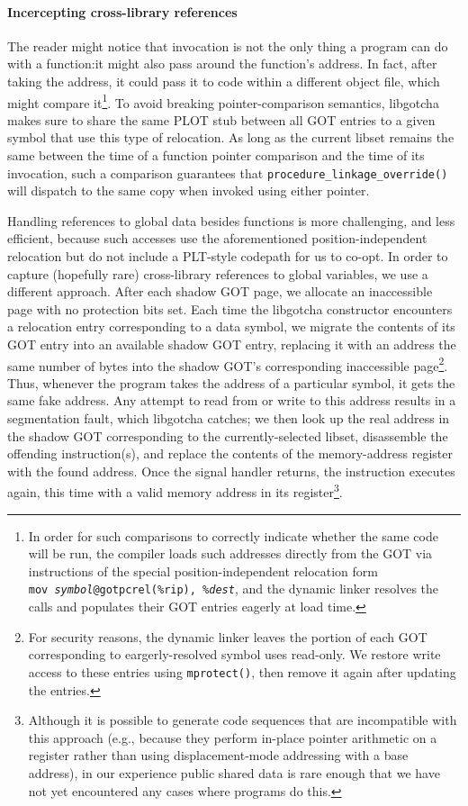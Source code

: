 \paragraph{Incercepting cross-library references}

The reader might notice that invocation is not the only thing a program can do with a
function:\@ it might also pass around the function's address.  In fact, after taking
the address, it could pass it to code within a different object file, which might
compare it\footnote{In order for such comparisons to correctly indicate whether the
same code will be run, the compiler loads such addresses directly from the GOT via
instructions of the special position-independent relocation form
\texttt{mov~\textit{symbol}@gotpcrel(\%rip),~\%\textit{dest}}, and the dynamic linker
resolves the calls and populates their GOT entries eagerly at load time.}.  To avoid
breaking pointer-comparison semantics, libgotcha makes sure to share the same PLOT
stub between all GOT entries to a given symbol that use this type of
relocation.  As long as the current libset remains the same between the time of a
function pointer comparison and the time of its invocation, such a comparison
guarantees that \texttt{procedure\_linkage\_override()} will dispatch to the same
copy when invoked using either pointer.

Handling references to global data besides functions is more challenging, and less
efficient, because such accesses use the aforementioned position-independent
relocation but do not include a PLT-style codepath for us to co-opt.
In order to capture (hopefully rare) cross-library references to global variables,
we use a different approach.  After each shadow GOT page, we allocate an inaccessible
page with no protection bits set.  Each time the libgotcha constructor encounters a
relocation entry corresponding to a data symbol, we migrate the contents of its GOT
entry into an available shadow GOT entry, replacing it with an address the same
number of bytes into the shadow GOT's corresponding inaccessible page\footnote{For
security reasons, the dynamic linker leaves the portion of each GOT corresponding to
eargerly-resolved symbol uses read-only.  We restore write access to these entries
using \texttt{mprotect()}, then remove it again after updating the entries.}.  Thus,
whenever the program takes the address of a particular symbol, it gets the same fake
address.  Any attempt to read from or write to this address results in a segmentation
fault, which libgotcha catches; we then look up the real address in the shadow GOT
corresponding to the currently-selected libset, disassemble the offending
instruction(s), and replace the contents of the memory-address register with the
found address.  Once the signal handler returns, the instruction executes again, this
time with a valid memory address in its register\footnote{Although it is possible to
generate code sequences that are incompatible with this approach (e.g., because they
perform in-place pointer arithmetic on a register rather than using displacement-mode
addressing with a base address), in our experience public shared data is rare enough
that we have not yet encountered any cases where programs do this.}.

